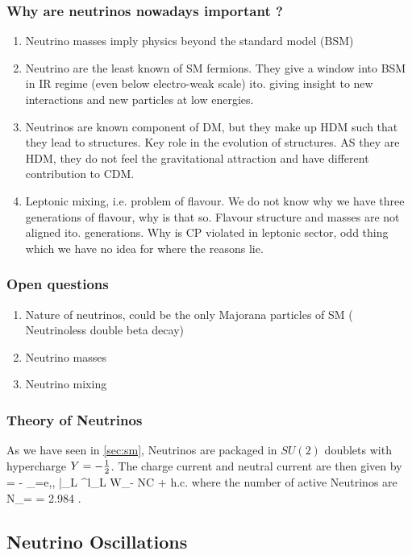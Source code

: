 \subsubsection{Why are neutrinos nowadays important ?}
\begin{enumerate}
	\item Neutrino masses imply physics beyond the standard model (BSM)
	\item Neutrino are the least known of SM fermions. They give a window into BSM in IR regime (even below electro-weak scale) ito. giving insight to new interactions and new particles at low energies.
	\item Neutrinos are known component of DM, but they make up HDM such that they lead to structures. Key role in the evolution of structures. AS they are HDM, they do not feel the gravitational attraction and have different contribution to CDM.
	\item Leptonic mixing, i.e. problem of flavour. We do not know why we have three generations of flavour, why is that so. Flavour structure and masses are not aligned ito. generations. Why is CP violated in leptonic sector, odd thing which we have no idea for where the reasons lie.
\end{enumerate}
\subsubsection{Open questions}
\begin{enumerate}
	\item Nature of neutrinos, could be the only Majorana particles of SM ( Neutrinoless double beta decay)
	\item Neutrino masses
	\item Neutrino mixing
\end{enumerate}
\subsubsection{Theory of Neutrinos}
As we have seen in \ref{sec:sm}, Neutrinos are packaged in $SU(2)$ doublets with hypercharge $Y=-\frac{1}{2}$. The charge current and neutral current are then given by
\bse 
\mL = -  \sum_{\alpha=e,\mu,\sigma} \bar{\nu}_{\alpha L} \gamma^\mu l_{\alpha L} W_\mu -  NC + h.c.
\ese 
where the number of active Neutrinos are
\bse 
N_\nu =  = 2.984 . 
\ese 

\subsection{Neutrino Oscillations}





